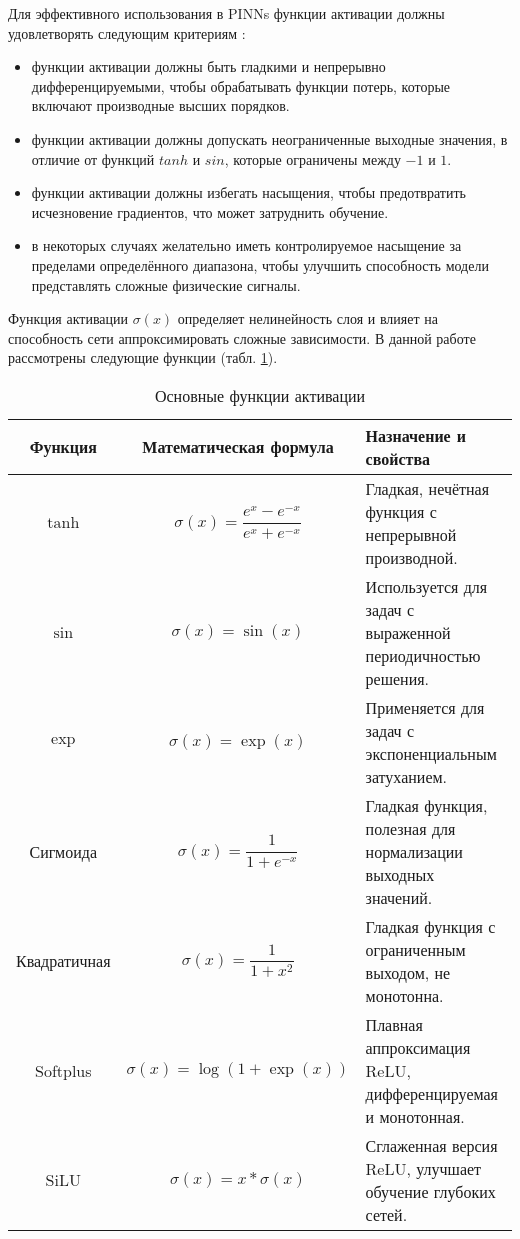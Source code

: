 Для эффективного использования в PINNs функции активации должны удовлетворять следующим
критериям \cite{0d752c79fb816703274a3d37f85a85689a2a9405}:
\begin{itemize}
    \item функции активации должны быть гладкими и
    непрерывно дифференцируемыми, чтобы обрабатывать функции потерь, которые включают
    производные высших порядков.
    \item функции активации должны допускать неограниченные
    выходные значения, в отличие от функций $tanh$ и $sin$, которые ограничены между $-1$ и $1$.
    \item функции активации должны избегать насыщения, чтобы предотвратить
    исчезновение градиентов, что может затруднить обучение.
    \item в некоторых случаях желательно иметь контролируемое насыщение за пределами определённого
    диапазона, чтобы улучшить способность модели представлять сложные физические сигналы.
\end{itemize}


Функция активации $\sigma(x)$ определяет нелинейность слоя и влияет на способность
сети аппроксимировать сложные зависимости. В данной работе рассмотрены следующие функции
(табл. \ref{table:act_basic}).

\begin{table}[h!]
    \centering
    \caption{Основные функции активации \cite{tensorflow2015-whitepaper}}
    \renewcommand{\arraystretch}{1.5}
    \begin{tabular}{|c|c|p{7cm}|}
    \hline
    \textbf{Функция} & \textbf{Математическая формула} & \textbf{Назначение и свойства} \\
    \hline
    $\tanh$ & $\sigma(x) = \dfrac{e^{x} - e^{-x}}{e^{x} + e^{-x}}$ & Гладкая, нечётная функция с непрерывной производной. \\
    \hline
    $\sin$ & $\sigma(x) = \sin(x)$ & Используется для задач с выраженной периодичностью решения. \\
    \hline
    $\exp$ & $\sigma(x) = \exp(x)$ & Применяется для задач с экспоненциальным затуханием. \\
    \hline
    Сигмоида & $\sigma(x) = \dfrac{1}{1 + e^{-x}}$ & Гладкая функция, полезная для нормализации выходных значений. \\
    \hline
    Квадратичная & $\sigma(x) = \dfrac{1}{1 + x^2}$ & Гладкая функция с ограниченным выходом, не монотонна. \\
    \hline
    Softplus & $\sigma(x) = \log(1 + \exp(x))$ & Плавная аппроксимация ReLU, дифференцируемая и монотонная. \\
    \hline
    SiLU & $\sigma(x) = x * \sigma(x)$ & Сглаженная версия ReLU, улучшает обучение глубоких сетей. \\
    \hline
    \end{tabular}
    \label{table:act_basic}
\end{table}

